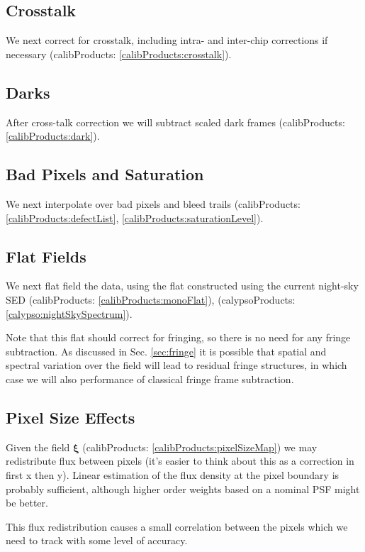 \documentclass[12pt]{article}
\newcommand{\xib}{{\boldsymbol \xi}}
\newcommand{\outputData}[1]{(calibProducts: \ref{calibProducts:#1})}
\newcommand{\outputDataII}[2]{(calibProducts: \ref{calibProducts:#1}, \ref{calibProducts:#2})}
\newcommand{\calypsoData}[1]{(calypsoProducts: \ref{calypso:#1})}
\newcommand{\secRef}[1]{Sec. \ref{sec:#1}}
\begin{document}
\subsection{Crosstalk}

We next correct for crosstalk, including intra- and inter-chip corrections if necessary
\outputData{crosstalk}.

\subsection{Darks}

After cross-talk correction we will subtract scaled dark frames \outputData{dark}.

\subsection{Bad Pixels and Saturation}

We next interpolate over bad pixels and bleed trails \outputDataII{defectList}{saturationLevel}.

\subsection{Flat Fields}
\label{sec:applySkyFlat}

We next flat field the data, using the flat constructed using the current night-sky SED
\outputData{monoFlat}, \calypsoData{nightSkySpectrum}.  

Note that this
flat should correct for fringing, so there is no need for any fringe subtraction.   As discussed
in \secRef{fringe} it is possible that spatial and spectral variation over the field will lead
to residual fringe structures, in which case we will also performance of classical fringe frame
subtraction.

\subsection{Pixel Size Effects}
\label{sec:correctingPixelSizes}

Given the field $\xib$ \outputData{pixelSizeMap} we may redistribute flux between pixels (it's easier to think
about this as a correction in first x then y).  Linear estimation of the flux density at the pixel boundary is
probably sufficient, although higher order weights based on a nominal PSF might be better.

This flux redistribution causes a small correlation between the pixels which we need to track
with some level of accuracy.
\end{document}
